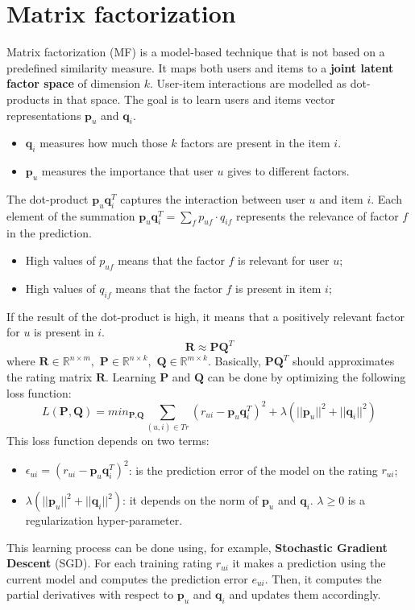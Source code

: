 \section{Matrix factorization}
Matrix factorization (MF) is a model-based technique that is not based on a predefined similarity measure. It maps both users and items to a \textbf{joint latent factor space} of dimension $k$. User-item interactions are modelled as dot-products in that space. The goal is to learn users and items vector representations $\textbf{p}_{u}$ and $\textbf{q}_{i}$.
\begin{itemize}
    \item $\textbf{q}_{i}$ measures how much those $k$ factors are present in the item $i$.
    \item $\textbf{p}_{u}$ measures the importance that user $u$ gives to different factors.
\end{itemize}
The dot-product $\textbf{p}_{u}\textbf{q}_{i}^{T}$ captures the interaction between user $u$ and item $i$.\newline\newline
Each element of the summation $\textbf{p}_{u}\textbf{q}_{i}^{T} = \sum_{f}p_{uf} \cdot q_{if}$ represents the relevance of factor $f$ in the prediction. 
\begin{itemize}
    \item High values of $p_{uf}$ means that the factor $f$ is relevant for user $u$;
    \item High values of $q_{if}$ means that the factor $f$ is present in item $i$; 
\end{itemize}
If the result of the dot-product is high, it means that a positively relevant factor for $u$ is present in $i$.
\[\textbf{R} \approx \textbf{P}\textbf{Q}^{T}\]
where $\textbf{R} \in \mathbb{R}^{n \times m}, \,\, \textbf{P} \in \mathbb{R}^{n \times k}, \,\, \textbf{Q} \in \mathbb{R}^{m \times k}$. Basically, $\textbf{P}\textbf{Q}^{T}$ should approximates the rating matrix $\textbf{R}$.\newline\newline
Learning $\textbf{P}$ and $\textbf{Q}$ can be done by optimizing the following loss function:
\[L(\textbf{P}, \textbf{Q}) = min_{\textbf{P},\textbf{Q}}\sum_{(u,i) \in Tr}\left( r_{ui} -  \textbf{p}_{u}\textbf{q}_{i}^{T}\right)^{2} + \lambda(||\textbf{p}_{u}||^{2} + ||\textbf{q}_{i}||^{2})  \]
This loss function depends on two terms:
\begin{itemize}
    \item $\epsilon_{ui} = \left( r_{ui} -  \textbf{p}_{u}\textbf{q}_{i}^{T}\right)^{2}$: is the prediction error of the model on the rating $r_{ui}$;
    \item $\lambda(||\textbf{p}_{u}||^{2} + ||\textbf{q}_{i}||^{2})$: it depends on the norm of $\textbf{p}_{u}$ and $\textbf{q}_{i}$. $\lambda \geq 0$ is a regularization hyper-parameter.
\end{itemize}
This learning process can be done using, for example, \textbf{Stochastic Gradient Descent} (SGD). For each training rating $r_{ui}$ it makes a prediction using the current model and computes the prediction error $e_{ui}$. Then, it computes the partial derivatives with respect to $\textbf{p}_{u}$ and $\textbf{q}_{i}$ and updates them accordingly.

